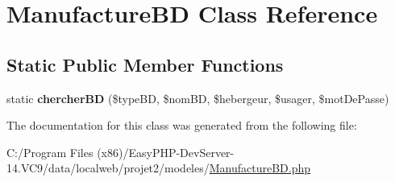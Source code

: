 \hypertarget{class_manufacture_b_d}{}\section{Manufacture\+BD Class Reference}
\label{class_manufacture_b_d}
\subsection*{Static Public Member Functions}
\begin{DoxyCompactItemize}
\item 
\mbox{\label{class_manufacture_b_d_afbdbc9840af04a0bf445e9cebbb7baea}} 
static {\bfseries chercher\+BD} (\$type\+BD, \$nom\+BD, \$hebergeur, \$usager, \$mot\+De\+Passe)
\end{DoxyCompactItemize}


The documentation for this class was generated from the following file\+:\begin{DoxyCompactItemize}
\item 
C\+:/\+Program Files (x86)/\+Easy\+P\+H\+P-\/\+Dev\+Server-\/14.\+V\+C9/data/localweb/projet2/modeles/\hyperlink{_manufacture_b_d_8php}{Manufacture\+B\+D.\+php}\end{DoxyCompactItemize}

